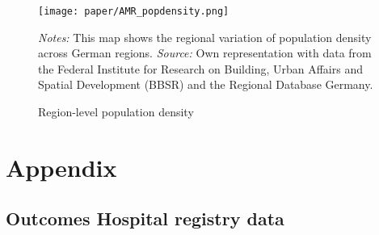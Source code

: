 \documentclass[11pt, a4paper]{article} %
\begin{document}
\vspace*{\fill}
\begin{figure}[H]\centering
	\caption{Region-level population density}\label{fig: AMR_regions_population_density}
	\texttt{[image: paper/AMR\_popdensity.png]}
	\scriptsize
	\begin{minipage}{0.9\linewidth}
		\emph{Notes:} This map shows the regional variation of population density across German regions. \emph{Source:} Own representation with data from the Federal Institute for Research on Building, Urban Affairs and Spatial Development (BBSR) and the Regional Database Germany.
	\end{minipage}
\end{figure}
\vspace*{\fill}\clearpage






\newpage
\section{Appendix}
\subsection{Outcomes Hospital registry data}
\end{document}
